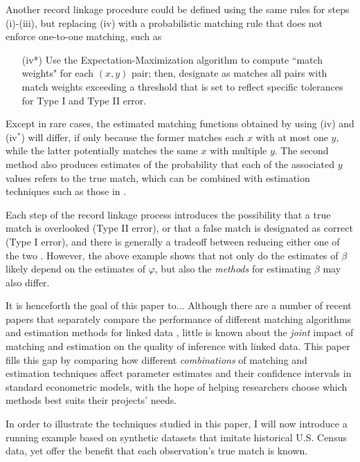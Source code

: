 \documentclass[12pt]{article}
\begin{document}
Another record linkage procedure could be defined using the same rules for steps (i)-(iii), but replacing (iv) with a probabilistic matching rule that does not enforce one-to-one matching, such as
\begin{enumerate}
\item[(iv*)]  Use the Expectation-Maximization algorithm to compute ``match weights" for each $(x,y)$ pair; then, designate as matches all pairs with match weights exceeding a threshold that is set to reflect specific tolerances for Type I and Type II error. 
\end{enumerate} 
Except in rare cases, the estimated matching functions obtained by using (iv) and (iv$^*$) will differ, if only because the former matches each $x$ with at most one $y$, while the latter potentially matches the same $x$ with multiple $y$.  The second method also produces estimates of the probability that each of the associated $y$ values refers to the true match, which can be combined with estimation techniques such as those in \cite{lahiri05}. 

Each step of the record linkage process introduces the possibility that a true match is overlooked (Type II error), or that a false match is designated as correct (Type I error), and there is generally a tradeoff between reducing either one of the two \citep{abe2019, harron2018}.  However, the above example shows that not only do the estimates of $\beta$ likely depend on the estimates of $\varphi$, but also the \textit{methods} for estimating $\beta$ may also differ. 

It is henceforth the goal of this paper to... 
Although there are a number of recent papers that separately compare the performance of different matching algorithms  \citep{bailey2017, arp2018} and estimation methods for linked data \citep{harron2014}, little is known about the \textit{joint} impact of matching and estimation on the quality of inference with linked data.  This paper fills this gap by comparing how different \textit{combinations} of matching and estimation techniques affect parameter estimates and their confidence intervals in standard econometric models, with the hope of helping researchers choose which methods best suits their projects' needs. 

In order to illustrate the techniques studied in this paper, I will now introduce a running example based on synthetic datasets that imitate historical U.S. Census data, yet offer the benefit that each observation's true match is known.  
\end{document}
